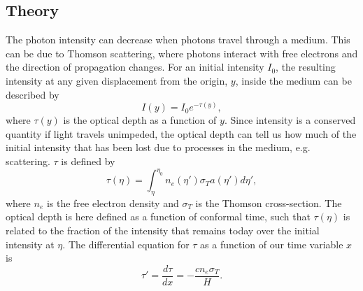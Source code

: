 \documentclass{aa}
\begin{document}
\subsection{Theory}

The photon intensity can decrease when photons travel through a medium. This can be due to Thomson scattering, where photons interact with free electrons and the direction
of propagation changes. For an initial intensity $I_0$, the resulting intensity at any given displacement from the origin, $y$, inside the medium can be described by
\begin{equation}
   I(y) = I_0e^{-\tau(y)},
\end{equation}   
where $\tau(y)$ is the optical depth as a function of $y$. Since intensity is a conserved quantity if light travels unimpeded,
the optical depth can tell us how much of the initial intensity that has been lost due to processes in the medium, e.g. scattering. $\tau$ is defined by
\begin{equation}
   \tau(\eta) = \int_{\eta}^{\eta_0} n_e(\eta') \sigma_T a(\eta') d\eta',
\end{equation}
where $n_e$ is the free electron density and $\sigma_T$ is the Thomson cross-section. The optical depth is here defined as a function of conformal time, 
such that $\tau(\eta)$ is related to the fraction of the intensity that remains today over the initial intensity at $\eta$. The differential equation for $\tau$ as a function
of our time variable $x$ is 
\begin{equation}
   \tau' = \frac{d\tau}{dx} = -\frac{c n_e \sigma_T }{H}.
\end{equation} 
\end{document}
